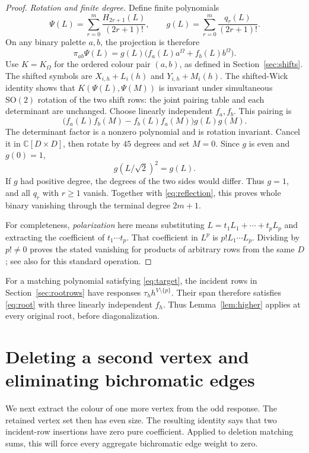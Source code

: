 \documentclass[11pt]{article}
\theoremstyle{definition}
\theoremstyle{plain}
\numberwithin{equation}{section}
\begin{document}
\begin{proof}
\emph{Rotation and finite degree.}
Define finite polynomials
\[
 \Psi(L)=\sum_{r=0}^m\frac{H_{2r+1}(L)}{(2r+1)!},
 \qquad
 g(L)=\sum_{r=0}^m\frac{q_r(L)}{(2r+1)!}.
\]
On any binary palette \(a,b\), the projection is therefore
\[
 \pi_{ab}\Psi(L)=g(L)\bigl(f_a(L)a^\Omega+f_b(L)b^\Omega\bigr).
\]
Use \(K=K_\Omega\) for the ordered colour pair \((a,b)\), as defined in
Section~\ref{sec:shifts}. The shifted symbols are
\(X_{i,h}+L_i(h)\) and \(Y_{i,h}+M_i(h)\). The shifted-Wick identity
shows that \(K(\Psi(L),\Psi(M))\) is invariant under simultaneous
\(\mathrm{SO}(2)\) rotation of the two shift rows: the joint pairing table
and each determinant are unchanged. Choose linearly independent
\(f_a,f_b\). This pairing is
\[
 \bigl(f_a(L)f_b(M)-f_b(L)f_a(M)\bigr)g(L)g(M).
\]
The determinant factor is a nonzero polynomial and is rotation invariant.
Cancel it in \(\mathbb C[D\times D]\), then rotate by \(45\) degrees and set
\(M=0\). Since \(g\) is even and \(g(0)=1\),
\[
 g(L/\sqrt2)^2=g(L).
\]
If \(g\) had positive degree, the degrees of the two sides would differ.
Thus \(g=1\), and all \(q_r\) with \(r\ge1\) vanish. Together with
\eqref{eq:reflection}, this proves whole binary vanishing through the
terminal degree \(2m+1\).

For completeness, \emph{polarization} here means substituting
\(L=t_1L_1+\cdots+t_pL_p\) and extracting the coefficient of
\(t_1\cdots t_p\). That coefficient in \(L^p\) is
\(p!L_1\cdots L_p\). Dividing by \(p!\ne0\) proves the stated vanishing
for products of arbitrary rows from the same \(D\); see also
\cite[Sections~4.4--4.5]{kraft} for this standard operation.
\end{proof}

For a matching polynomial satisfying \eqref{eq:target}, the incident rows
in Section~\ref{sec:rootrows} have responses
\(\tau_hh^{V\setminus\{p\}}\). Their span therefore satisfies
\eqref{eq:root} with three linearly independent \(f_h\). Thus
Lemma~\ref{lem:higher} applies at every original root, before diagonalization.

\section{Deleting a second vertex and eliminating bichromatic edges}\label{sec:diagonal}

We next extract the colour of one more vertex from the odd response.
The retained vertex set then has even size. The resulting identity says that
two incident-row insertions have zero pure coefficient. Applied to deletion
matching sums, this will force every aggregate bichromatic edge weight to zero.
\end{document}
